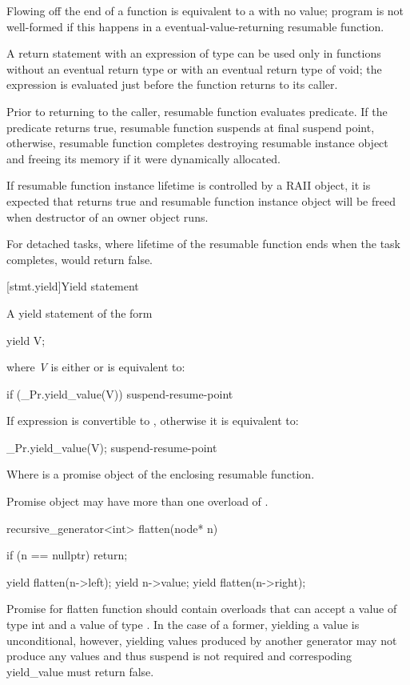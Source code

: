Flowing off the end of a function is equivalent to a  with
no value; program is not well-formed if this happens in a eventual-value-returning resumable function.

\pnum
A return statement with an expression of type 
can be used only in functions without an eventual return type 
or with an eventual return type of void; the expression is evaluated just before the function
returns to its caller.

\pnum
Prior to returning to the caller, resumable function evaluates
 predicate. If the predicate returns
true, resumable function suspends at final suspend point,
otherwise, resumable function completes destroying resumable instance
object and freeing its memory if it were dynamically allocated.

\enternote
If resumable function instance lifetime is controlled 
by a RAII object, it is expected that  returns true
and resumable function instance object will be freed when
destructor of an owner object runs.

For detached tasks, where lifetime of the resumable function ends
when the task completes,  would return false.
\exitnote

[stmt.yield]{Yield statement}%

\pnum
A yield statement of the form

\begin{codeblock}
	yield V;
\end{codeblock}

where \textit{V} is either  or  is equivalent to:

\begin{codeblock}
	if (_Pr.yield_value(V)) {
		suspend-resume-point
	}
\end{codeblock}

If  expression is convertible to , otherwise it is equivalent to:

\begin{codeblock}
	_Pr.yield_value(V);
	suspend-resume-point
\end{codeblock}

Where  is a promise object of the enclosing resumable function.

\pnum
Promise object may have more than one overload of .

\enterexample
\begin{codeblock}
	recursive_generator<int> flatten(node* n)
	{
		if (n == nullptr)
			return;
			
		yield flatten(n->left);
		yield n->value;
		yield flatten(n->right);
	}
\end{codeblock}

Promise for flatten function should contain overloads that can accept a value of type int and a value of type .
In the case of a former, yielding a value is unconditional, however, yielding values produced by another generator may not produce
any values and thus suspend is not required and correspoding yield_value must return false. 
\exitexample